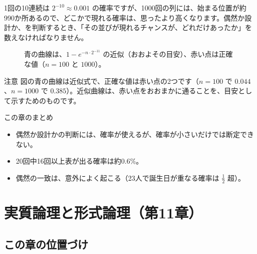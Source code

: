 \documentclass[a4paper,11pt,openany]{ltjsbook}
\begin{document}
1回の10連続は $2^{-10}\approx0.001$ の確率ですが、1000回の列には、始まる位置が約990か所あるので、どこかで現れる確率は、思ったより高くなります。偶然か設計か、を判断するとき、「その並びが現れるチャンスが、どれだけあったか」を数えなければなりません。

\begin{figure}[htbp]
\centering
{}
\caption{青の曲線は、$1-e^{-n\cdot2^{-11}}$ の近似（おおよその目安）、赤い点は正確な値（$n=100$ と $1000$）。}
\end{figure}

\begin{notebox}{注意}
図の青の曲線は近似式で、正確な値は赤い点の2つです（$n=100$ で $0.044$、$n=1000$ で $0.385$）。近似曲線は、赤い点をおおまかに通ることを、目安として示すためのものです。
\end{notebox}

\begin{pointbox}{この章のまとめ}
\begin{itemize}[leftmargin=*]
\item 偶然か設計かの判断には、確率が使えるが、確率が小さいだけでは断定できない。
\item 20回中16回以上表が出る確率は約0.6\%。
\item 偶然の一致は、意外によく起こる（23人で誕生日が重なる確率は $\tfrac12$ 超）。
\end{itemize}
\end{pointbox}

\chapter{実質論理と形式論理（第11章）}

\section{この章の位置づけ}
\end{document}
